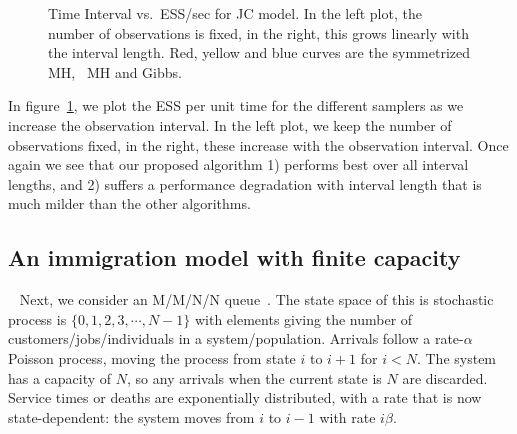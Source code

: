 {\begin{figure}
\begin{minipage}[!hp]{0.99\linewidth}
  \end{minipage}
    \caption{Time Interval vs.\ ESS/sec for JC model. In the left plot, the number of 
    observations is fixed, in the right, this grows linearly with the
  interval length. Red, yellow and blue curves are the symmetrized MH,
  \naive\ MH and Gibbs. }
	\label{fig:jc_model_vs_t}
  \end{figure}

In figure~\ref{fig:jc_model_vs_t}, we plot the ESS per unit time for the
different samplers as we increase the observation interval. In the left plot,
we keep the number of observations fixed, in the right, these increase with
the observation interval. Once again we see that our proposed algorithm
1) performs best over all interval lengths, and 2) suffers a performance
degradation with interval length that is much milder than the other algorithms.

\subsection{An immigration model with finite capacity}\label{sec:immig}~
Next, we consider an M/M/N/N queue~\citep{gross2011fundamentals}. The state space of this is stochastic 
process is $\{0, 1, 2, 3, \cdots, N - 1\}$ with 
elements giving the number of customers/jobs/individuals in a system/population. 
Arrivals follow a rate-$\alpha$ Poisson process, moving the process from state 
$i$ to $i+1$ for $i<N$. The system has a capacity of $N$, so any arrivals when 
the current state is $N$ are discarded.  Service times or deaths are 
exponentially distributed, with a rate that is now state-dependent:
the system moves from $i$ to $i - 1$ with rate $i\beta$. 

}
